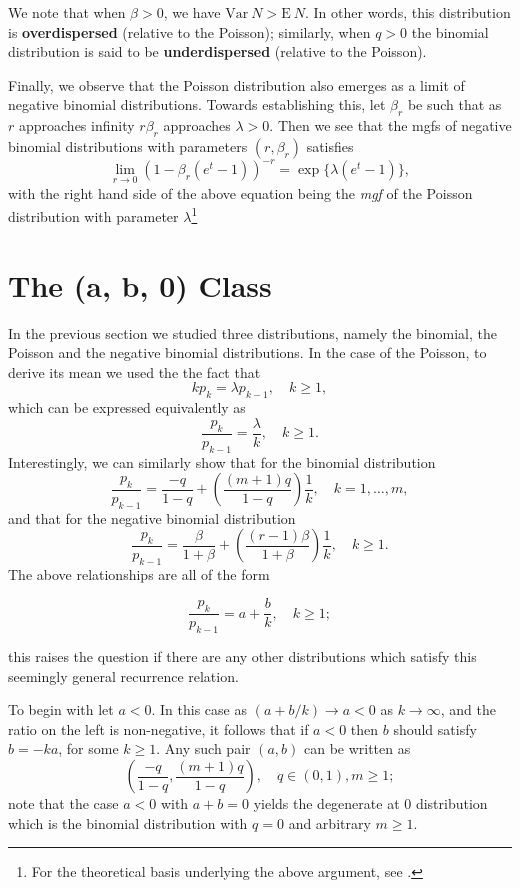 \documentclass[]{book}
\let\rmarkdownfootnote\footnote%
\def\footnote{\protect\rmarkdownfootnote}
\theoremstyle{definition}
\theoremstyle{definition}
\theoremstyle{definition}
\theoremstyle{remark}
\begin{document}
We note that when \(\beta>0\), we have
\(\mathrm{Var}~{N} >\mathrm{E}~{N}\). In other words, this distribution
is \textbf{overdispersed} (relative to the Poisson); similarly, when
\(q>0\) the binomial distribution is said to be \textbf{underdispersed}
(relative to the Poisson).

Finally, we observe that the Poisson distribution also emerges as a
limit of negative binomial distributions. Towards establishing this, let
\(\beta_r\) be such that as \(r\) approaches infinity \(r\beta_r\)
approaches \(\lambda>0\). Then we see that the mgfs of negative binomial
distributions with parameters \((r,\beta_r)\) satisfies \[
\lim_{r\rightarrow 0} (1-\beta_r(e^t-1))^{-r}=\exp\{\lambda(e^t-1)\},
\] with the right hand side of the above equation being the \emph{mgf}
of the Poisson distribution with parameter \(\lambda\)\footnote{For the
  theoretical basis underlying the above argument, see
  \citep{billingsley}.}

\section{The (a, b, 0) Class}\label{S:the-a-b-0-class}

In the previous section we studied three distributions, namely the
binomial, the Poisson and the negative binomial distributions. In the
case of the Poisson, to derive its mean we used the the fact that \[
kp_k=\lambda p_{k-1}, \quad k\geq 1,
\] which can be expressed equivalently as \[
\frac{p_k}{p_{k-1}}=\frac{\lambda}{k}, \quad k\geq 1. 
\] Interestingly, we can similarly show that for the binomial
distribution \[
\frac{p_k}{p_{k-1}}=\frac{-q}{1-q}+\left(\frac{(m+1)q}{1-q}\right)\frac{1}{k}, \quad k=1,\ldots,m, 
\] and that for the negative binomial distribution \[
\frac{p_k}{p_{k-1}}=\frac{\beta}{1+\beta}+\left(\frac{(r-1)\beta}{1+\beta}\right)\frac{1}{k}, \quad k\geq 1. 
\] The above relationships are all of the form

\begin{equation}
\frac{p_k}{p_{k-1}}=a+\frac{b}{k}, \quad k\geq 1; 
\label{eq:ab0}
\end{equation}

this raises the question if there are any other distributions which
satisfy this seemingly general recurrence relation.

To begin with let \(a<0\). In this case as \((a+b/k)\rightarrow a<0\) as
\(k\rightarrow \infty\), and the ratio on the left is non-negative, it
follows that if \(a<0\) then \(b\) should satisfy \(b=-ka\), for some
\(k\geq 1\). Any such pair \((a,b)\) can be written as \[
\left(\frac{-q}{1-q},\frac{(m+1)q}{1-q}\right), \quad q\in(0,1), m\geq 1;
\] note that the case \(a<0\) with \(a+b=0\) yields the degenerate at
\(0\) distribution which is the binomial distribution with \(q=0\) and
arbitrary \(m\geq 1\).
\end{document}
